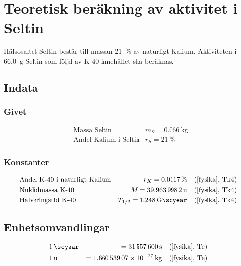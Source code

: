 \section{Teoretisk beräkning av aktivitet i Seltin} \label{sec:seltin}

Hälsosaltet Seltin består till massan \qty{21}{\percent} av naturligt Kalium.
Aktiviteten i \qty{66.0}{\g} Seltin som följd av K-40-innehållet ska beräknas.

\subsection{Indata}

\subsubsection{Givet}

\begin{align*}
    & \text{Massa Seltin}          & m_S = \qty{0.066}{\kg} \\
    & \text{Andel Kalium i Seltin} & r_S = \qty{21}{\percent}
\end{align*}

\subsubsection{Konstanter}

\begin{align*}
    & \text{Andel K-40 i naturligt Kalium} & r_K     = \qty{0.0117}{\percent}     &\quad \text{(\cite{fysika}, Tk4)} \\
    & \text{Nuklidmassa K-40}              & M       = \qty{39.9639982}{\atomicmassunit}  &\quad \text{(\cite{fysika}, Tk4)} \\
    & \text{Halveringstid K-40}            & T_{1/2} = \qty{1.248}{\giga\scyear} &\quad \text{(\cite{fysika}, Tk4)}
\end{align*}

\subsection{Enhetsomvandlingar}

\begin{align*}
    & \qty{1}{\scyear} &= \qty{31557600}{\s}         &\quad \text{(\cite{fysika}, Te)} \\
    & \qty{1}{\atomicmassunit} &= \qty{1.66053907e-27}{\kg} &\quad \text{(\cite{fysika}, Te)}
\end{align*}

